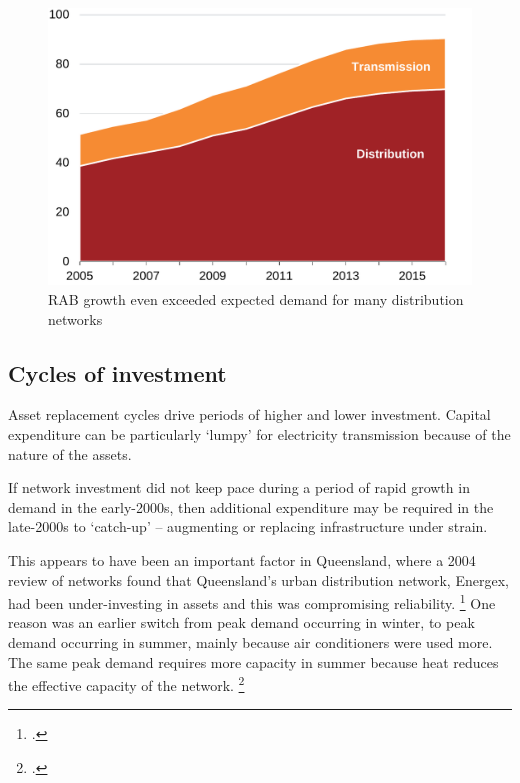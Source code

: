 \documentclass[FrontPage]{grattan}
\begin{document}
\begin{figure}
\caption{RAB growth even exceeded expected demand for many distribution networks}\label{fig:network-growth-exceeded-expected-demand}
\includegraphics[page=7]{atlas/Charts.pdf}
\end{figure}

\subsection{Cycles of investment}\label{subsec:cycles-of-investment}
Asset replacement cycles drive periods of higher and lower investment. Capital expenditure can be particularly `lumpy' for electricity transmission because of the nature of the assets. 

If network investment did not keep pace during a period of rapid growth in demand in the early-2000s, then additional expenditure may be required in the late-2000s to `catch-up' -- augmenting or replacing infrastructure under strain. 

This appears to have been an important factor in Queensland, where a 2004 review of networks found that Queensland's urban distribution network, Energex, had been under-investing in assets and this was compromising reliability.%
\footcite{Somerville2004EDSDreview}
One reason was an earlier switch from peak demand occurring in winter, to peak demand occurring in summer, mainly because air conditioners were used more. The same peak demand requires more capacity in summer because heat reduces the effective capacity of the network.%
\footnote{.}
\end{document}
